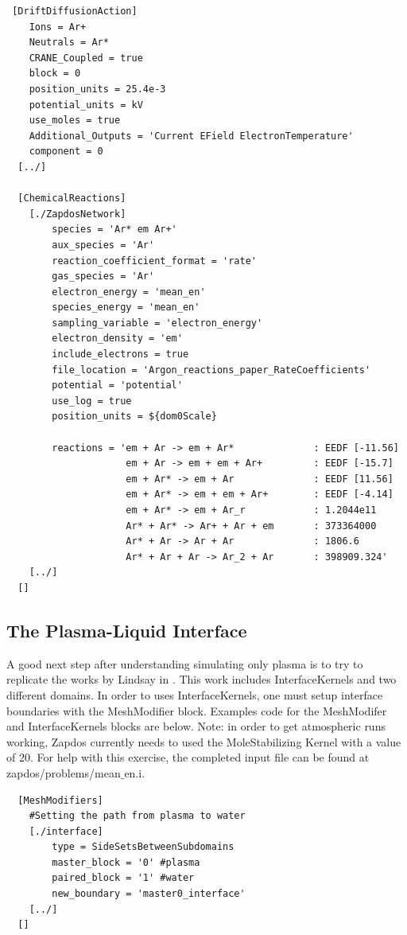 \documentclass[final]{report}
\begin{document}
  \begin{verbatim}
 [DriftDiffusionAction]
    Ions = Ar+
    Neutrals = Ar*
    CRANE_Coupled = true
    block = 0
    position_units = 25.4e-3
    potential_units = kV
    use_moles = true
    Additional_Outputs = 'Current EField ElectronTemperature'
    component = 0
  [../]

  [ChemicalReactions]
    [./ZapdosNetwork]
        species = 'Ar* em Ar+'
        aux_species = 'Ar'
        reaction_coefficient_format = 'rate'
        gas_species = 'Ar'
        electron_energy = 'mean_en'
        species_energy = 'mean_en'
        sampling_variable = 'electron_energy'
        electron_density = 'em'
        include_electrons = true
        file_location = 'Argon_reactions_paper_RateCoefficients'
        potential = 'potential'
        use_log = true
        position_units = ${dom0Scale}

        reactions = 'em + Ar -> em + Ar*              : EEDF [-11.56]
                     em + Ar -> em + em + Ar+         : EEDF [-15.7]
                     em + Ar* -> em + Ar              : EEDF [11.56]
                     em + Ar* -> em + em + Ar+        : EEDF [-4.14]
                     em + Ar* -> em + Ar_r            : 1.2044e11
                     Ar* + Ar* -> Ar+ + Ar + em       : 373364000
                     Ar* + Ar -> Ar + Ar              : 1806.6
                     Ar* + Ar + Ar -> Ar_2 + Ar       : 398909.324'
    [../]
  []
  \end{verbatim}

  \subsection{The Plasma-Liquid Interface}
  A good next step after understanding simulating only plasma is to try to replicate the works by Lindsay in \cite{plasma_water}. This work includes InterfaceKernels and two different domains. In order to uses InterfaceKernels, one must setup interface boundaries with the MeshModifier block. Examples code for the MeshModifer and InterfaceKernels blocks are below. Note: in order to get atmospheric runs working, Zapdos currently needs to used the MoleStabilizing Kernel with a value of 20. For help with this exercise, the completed input file can be found at \\ zapdos/problems/mean$\_$en.i.

  \begin{verbatim}
  [MeshModifiers]
    #Setting the path from plasma to water
    [./interface]
        type = SideSetsBetweenSubdomains
        master_block = '0' #plasma
        paired_block = '1' #water
        new_boundary = 'master0_interface'
    [../]
  []
  \end{verbatim}
\end{document}

